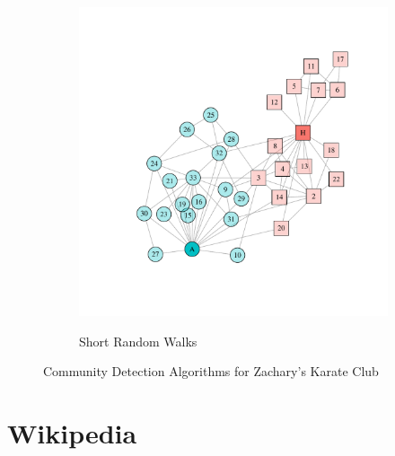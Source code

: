 \begin{figure}
\begin{subfigure}[b]{0.32\textwidth}
\label{fig:spinglass}
\end{subfigure}
\hfill
\begin{subfigure}[b]{0.32\textwidth}
\caption{Short Random Walks}
\includegraphics[width=\textwidth,trim={0.75in 0.75in 0.75in 0.75in}, clip=True]{walktrap.pdf}
\label{fig:walktrap}
\end{subfigure}
\caption{Community Detection Algorithms for Zachary's Karate Club}
\end{figure}

\section{Wikipedia}

\begin{appendices}

\end{appendices}



% 



